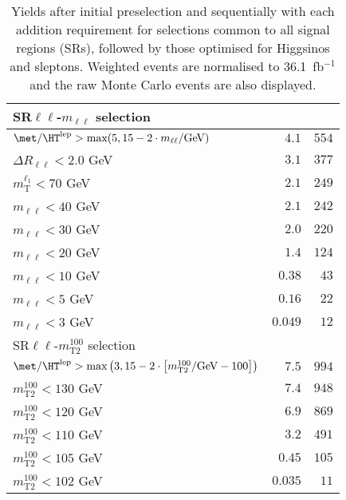\begin{table}
\begin{center}
\begin{tabular*}{\textwidth}{@{\extracolsep{\fill}}lrr}
\midrule
SR$\ell\ell$-$m_{\ell\ell}$ selection & \\ 
\midrule
$\met / \HT^\text{lep} > \text{max}(5, 15-2\cdot m_{\ell\ell}/\text{GeV})$ & $4.1$ & $554$   \\ 
    $\Delta R_{\ell\ell} < 2.0$ GeV & $3.1$ & $377$   \\ 
    $m_\text{T}^{\ell_1} < 70$ GeV & $2.1$ & $249$   \\ 
    $m_{\ell\ell} < 40$ GeV & $2.1$ & $242$   \\ 
    $m_{\ell\ell} < 30$ GeV & $2.0$ & $220$   \\ 
    $m_{\ell\ell} < 20$ GeV & $1.4$ & $124$   \\ 
    $m_{\ell\ell} < 10$ GeV & $0.38$ & $43$   \\ 
    $m_{\ell\ell} < 5$ GeV & $0.16$ & $22$   \\ 
    $m_{\ell\ell} < 3$ GeV & $0.049$ & $12$   \\ 
    \midrule
SR$\ell\ell$-$m_\text{T2}^{100}$ selection & \\ 
\midrule
$\met / \HT^\text{lep} > \text{max}\left(3, 15-2\cdot \left[m_\text{T2}^{100}/\text{GeV} - 100\right]\right)$ & $7.5$ & $994$   \\ 
    $m_\text{T2}^{100} < 130$ GeV & $7.4$ & $948$   \\ 
    $m_\text{T2}^{100} < 120$ GeV & $6.9$ & $869$   \\ 
    $m_\text{T2}^{100} < 110$ GeV & $3.2$ & $491$   \\ 
    $m_\text{T2}^{100} < 105$ GeV & $0.45$ & $105$   \\ 
    $m_\text{T2}^{100} < 102$ GeV & $0.035$ & $11$   \\ 
    
  \bottomrule
  \end{tabular*}
\end{center}
\caption{ Yields after initial preselection and sequentially with each addition requirement 
for selections common to all signal regions (SRs), 
followed by those optimised for Higgsinos and sleptons. 
Weighted events are normalised to 36.1~fb$^{-1}$ and the raw Monte Carlo events are also displayed.
}
\label{tab:cutflow_other}
\end{table} 
  